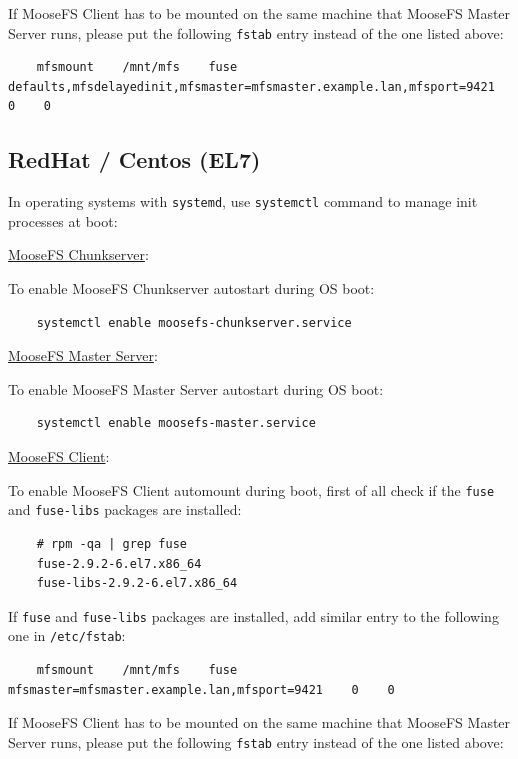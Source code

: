 \documentclass[a4paper,11pt,english]{report}
\def\code#1{\texttt{#1}}
\begin{document}
		If MooseFS Client has to be mounted on the same machine that MooseFS Master Server runs, please put the following \code{fstab} entry instead of the one listed above:
		
		\begin{lstlisting}
	mfsmount    /mnt/mfs    fuse    defaults,mfsdelayedinit,mfsmaster=mfsmaster.example.lan,mfsport=9421    0    0 
		\end{lstlisting}



\subsection{RedHat / Centos (EL7)}
		In operating systems with \code{systemd}, use \code{systemctl} command to manage init processes at boot:
		
		\underline{MooseFS Chunkserver}:
		
		To enable MooseFS Chunkserver autostart during OS boot:
		\begin{lstlisting}
	systemctl enable moosefs-chunkserver.service
		\end{lstlisting}
		
		\underline{MooseFS Master Server}:
		
		To enable MooseFS Master Server autostart during OS boot:
		\begin{lstlisting}
	systemctl enable moosefs-master.service
		\end{lstlisting}
		
	
		\underline{MooseFS Client}:
		
		To enable MooseFS Client automount during boot, first of all check if the \code{fuse} and \code{fuse-libs} packages are installed:
		\begin{lstlisting}
	# rpm -qa | grep fuse
	fuse-2.9.2-6.el7.x86_64
	fuse-libs-2.9.2-6.el7.x86_64
		\end{lstlisting}
		
		If \code{fuse} and \code{fuse-libs} packages are installed, add similar entry to the following one in \code{/etc/fstab}:

		\begin{lstlisting}
	mfsmount    /mnt/mfs    fuse    mfsmaster=mfsmaster.example.lan,mfsport=9421    0    0 
		\end{lstlisting}

		If MooseFS Client has to be mounted on the same machine that MooseFS Master Server runs, please put the following \code{fstab} entry instead of the one listed above:
		
\end{document}
